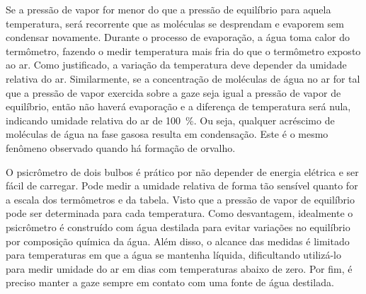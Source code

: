 Se a pressão de vapor for menor do que a pressão de equilíbrio para aquela temperatura, será recorrente que as moléculas se desprendam e evaporem sem condensar novamente. Durante o processo de evaporação, a água toma calor do termômetro, fazendo o medir temperatura mais fria do que o termômetro exposto ao ar. Como justificado, a variação da temperatura deve depender da umidade relativa do ar. Similarmente, se a concentração de moléculas de água no ar for tal que a pressão de vapor exercida sobre a gaze seja igual a pressão de vapor de equilíbrio, então não haverá evaporação e a diferença de temperatura será nula, indicando umidade relativa do ar de \qty{100}{\percent}. Ou seja, qualquer acréscimo de moléculas de água na fase gasosa resulta em condensação. Este é o mesmo fenômeno observado quando há formação de orvalho.

O psicrômetro de dois bulbos é prático por não depender de energia elétrica e ser fácil de carregar. Pode medir a umidade relativa de forma tão sensível quanto for a escala dos termômetros e da tabela. Visto que a pressão de vapor de equilíbrio pode ser determinada para cada temperatura. Como desvantagem, idealmente o psicrômetro é construído com água destilada para evitar variações no equilíbrio por composição química da água. Além disso, o alcance das medidas é limitado para temperaturas em que a água se mantenha líquida, dificultando utilizá-lo para medir umidade do ar em dias com temperaturas abaixo de zero. Por fim, é preciso manter a gaze sempre em contato com uma fonte de água destilada.
